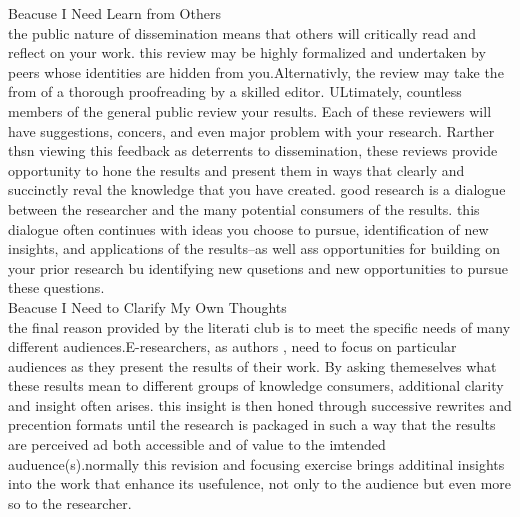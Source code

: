 \documentclass{book}
\begin{document}
Beacuse I Need Learn from Others\\

the public nature of dissemination means that others will critically read and reflect on 
your work. this review may be highly formalized and undertaken by peers whose
identities are  hidden from you.Alternativly, the review may take the from of a thorough
proofreading by a skilled editor. ULtimately, countless members of the general
public review your results. Each of these  reviewers will have suggestions, concers, and
even major problem with your research. Rarther thsn viewing this feedback as deterrents 
to dissemination, these reviews provide opportunity to hone the results and present them
in ways that clearly and succinctly reval the knowledge that you have created.
good research is a dialogue between the researcher and the many potential
consumers of the results. this dialogue often continues with ideas you choose to pursue,
identification of new insights, and applications of the results--as well ass opportunities 
for building on your prior research bu identifying new qusetions and new  opportunities to 
pursue these questions.\\

Beacuse I Need to Clarify My Own Thoughts\\

the final reason provided by the literati club is to meet the specific needs of many
different audiences.E-researchers, as authors , need to focus on particular audiences as 
they present the results of their work. By asking themeselves what these results mean to 
different groups of knowledge consumers, additional clarity and insight often arises.
this insight is then honed through successive rewrites and precention formats until
the research is packaged in such a way that the results are perceived ad both accessible 
and of value to the imtended auduence(s).normally this revision and focusing exercise brings
additinal insights into the work that enhance its usefulence, not only to the audience but
even more so to the researcher.
\end{document}
